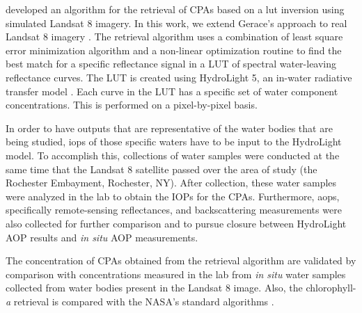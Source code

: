 \citet{Gerace:2013} developed an algorithm for the retrieval of CPAs based on a \acrfull{lut} inversion using simulated Landsat 8 imagery. In this work, we extend Gerace's approach to real Landsat 8 imagery \citep{Concha2013IGARSS}. The retrieval algorithm uses a combination of least square error minimization algorithm and a non-linear optimization routine to find the best match for a specific reflectance signal in a LUT of spectral water-leaving reflectance curves. The LUT is created using HydroLight 5, an in-water radiative transfer model \citep{Mobley:2005}. Each curve in the LUT has a specific set of water component concentrations. This is performed on a pixel-by-pixel basis. 

In order to have outputs that are representative of the water bodies that are being studied, \acrfull{iops} of those specific waters have to be input to the HydroLight model. To accomplish this, collections of water samples were conducted at the same time that the Landsat 8 satellite passed over the area of study (the Rochester Embayment, Rochester, NY). After collection, these water samples were analyzed in the lab to obtain the IOPs for the CPAs. Furthermore, \acrfull{aops}, specifically remote-sensing reflectances, and backscattering measurements were also collected for further comparison and to pursue closure between HydroLight AOP results and {\it in situ} AOP measurements.

The concentration of CPAs obtained from the retrieval algorithm are validated by comparison with concentrations measured in the lab from {\it in situ} water samples collected from water bodies present in the Landsat 8 image. Also, the chlorophyll-{\it a} retrieval is compared with the NASA's standard algorithms \citep{OReilly1998_Chl,OReilly2000,Hu:2012fv}.